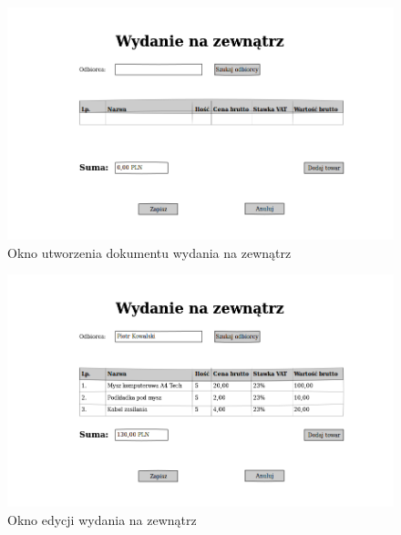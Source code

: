 \begin{figure}[!htb]
  \begin{center}
    \includegraphics[scale=0.45]{../img/interfejs/utworzenie-wydania-na-zewnatrz.png}
  \end{center}
  \caption{Okno utworzenia dokumentu wydania na zewnątrz}
\end{figure}
\FloatBarrier

\begin{figure}[!htb]
  \begin{center}
    \includegraphics[scale=0.45]{../img/interfejs/edycja-wydania-na-zewnatrz.png}
  \end{center}
  \caption{Okno edycji wydania na zewnątrz}
\end{figure}
\FloatBarrier


